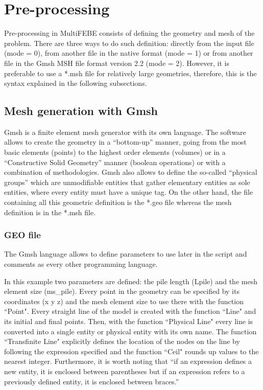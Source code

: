 \documentclass[a4]{article}
\begin{document}
\section{Pre-processing} 
Pre-processing in MultiFEBE consists of defining the geometry and mesh of the problem. There are three ways to do such definition: directly from the input file (mode = 0), from another file in the native format (mode = 1) or from another file in the Gmsh MSH file format version 2.2 (mode = 2). However, it is preferable to use a *.msh file for relatively large geometries, therefore, this is the syntax explained in the following subsections.
   
\subsection{Mesh generation with Gmsh}
Gmsh \cite{gmsh, gmshweb} is a finite element mesh generator with its own language. The software allows to create the geometry in a “bottom-up” manner, going from the most basic elements (points) to the highest order elements (volumes) or in a “Constructive Solid Geometry” manner (boolean operations) or with a combination of methodologies. Gmsh also allows to define  the so-called “physical groups” which are unmodifiable entities that gather elementary entities as sole entities, where every entity must have a unique tag. On the other hand, the file containing all this geometric definition is the *.geo file whereas the mesh definition is in the *.msh file. 

\subsubsection{GEO file}
The Gmsh language allows to define parameters to use later in the script and comments as every other programming language. 

In this example two parameters are defined: the pile length (Lpile) and the mesh element size (ms\_pile). Every point in the geometry can be specified by its coordinates (x y z) and the mesh element size to use there with the function ``Point". Every straight line of the model is created with the function ``Line" and its initial and final points. Then, with the function ``Physical Line" every line is converted into a single entity or physical entity with its own name. The function ``Transfinite Line" explicitly defines the location of the nodes on the line by following the expression specified and the function ``Ceil" rounds up values to the nearest integer. Furthermore, it is worth noting that “if an expression defines a new entity, it is enclosed between parentheses but if an expression refers to a previously defined entity, it is enclosed between braces.” \cite{gmshweb}
\end{document}
